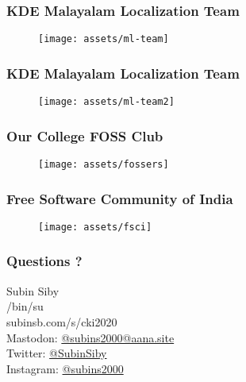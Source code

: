 \documentclass{beamer}
\begin{document}
\begin{frame}
\frametitle{KDE Malayalam Localization Team}
\begin{figure}
	\texttt{[image: assets/ml-team]}
\end{figure}
\end{frame}

\begin{frame}
\frametitle{KDE Malayalam Localization Team}
\begin{figure}
	\texttt{[image: assets/ml-team2]}
\end{figure}
\end{frame}

\begin{frame}
\frametitle{Our College FOSS Club}
\begin{figure}
	\texttt{[image: assets/fossers]}
\end{figure}
\end{frame}

\begin{frame}
\frametitle{Free Software Community of India}
\begin{figure}
	\texttt{[image: assets/fsci]}
\end{figure}
\end{frame}

\begin{frame}
\frametitle{Questions ?}
{\centering
	Subin Siby \\
	/bin/su \\
	subinsb.com/s/cki2020 \\ \vspace{5mm}
	Mastodon: \href{https://aana.site/subins2000}{@subins2000@aana.site} \\
	Twitter: \href{https://twitter.com/SubinSiby}{@SubinSiby} \\
	Instagram: \href{https://instagram.com/subins2000/}{@subins2000} \\
}
\end{frame}
\end{document}
